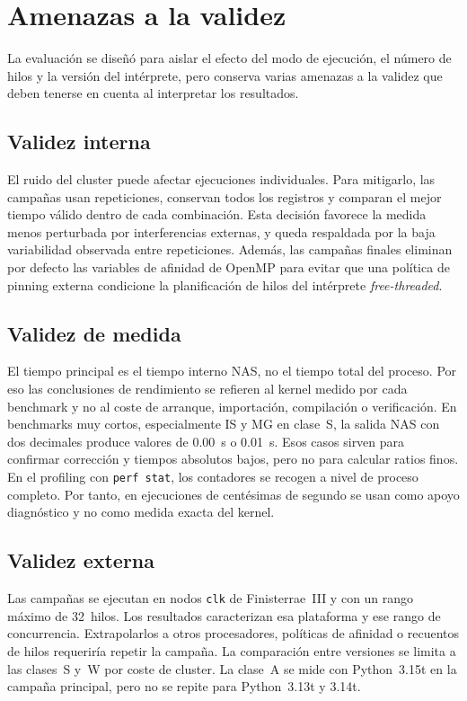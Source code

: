 \section{Amenazas a la validez}
\label{sec:amenazas-validez}

La evaluación se diseñó para aislar el efecto del modo de ejecución, el número
de hilos y la versión del intérprete, pero conserva varias amenazas a la validez
que deben tenerse en cuenta al interpretar los resultados.

\subsection{Validez interna}
El ruido del cluster puede afectar ejecuciones individuales. Para mitigarlo, las
campañas usan repeticiones, conservan todos los registros y comparan el mejor
tiempo válido dentro de cada combinación. Esta decisión favorece la medida menos
perturbada por interferencias externas, y queda respaldada por la baja
variabilidad observada entre repeticiones. Además, las campañas finales eliminan
por defecto las variables de afinidad de OpenMP para evitar que una política de
pinning externa condicione la planificación de hilos del intérprete
\emph{free-threaded}.

\subsection{Validez de medida}
El tiempo principal es el tiempo interno NAS, no el tiempo total del proceso. Por
eso las conclusiones de rendimiento se refieren al kernel medido por cada
benchmark y no al coste de arranque, importación, compilación o verificación. En
benchmarks muy cortos, especialmente IS y MG en clase~S, la salida NAS con dos
decimales produce valores de 0.00~s o 0.01~s. Esos casos sirven para confirmar
corrección y tiempos absolutos bajos, pero no para calcular ratios finos. En el
profiling con \texttt{perf stat}, los contadores se recogen a nivel de proceso
completo. Por tanto, en ejecuciones de centésimas de segundo se usan como apoyo
diagnóstico y no como medida exacta del kernel.

\subsection{Validez externa}
Las campañas se ejecutan en nodos \texttt{clk} de Finisterrae~III y con un rango
máximo de 32~hilos. Los resultados caracterizan esa plataforma y ese rango de
concurrencia. Extrapolarlos a otros procesadores, políticas de afinidad o
recuentos de hilos requeriría repetir la campaña. La comparación entre versiones
se limita a las clases~S y~W por coste de cluster. La clase~A se mide con
Python~3.15t en la campaña principal, pero no se repite para Python~3.13t y
3.14t.

